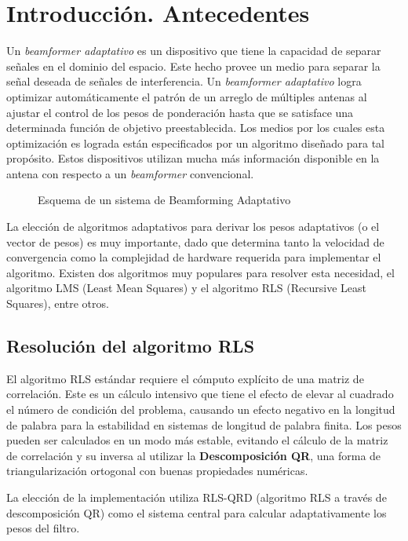 \documentclass[a4paper]{article}
\begin{document}
\section{Introducción. Antecedentes}

Un \textit{beamformer adaptativo} es un dispositivo que tiene la capacidad de separar señales en el dominio del espacio. Este hecho provee un medio para separar la señal deseada de señales de interferencia. Un \textit{beamformer adaptativo} logra optimizar automáticamente el patrón de un arreglo de múltiples antenas al ajustar el control de los pesos de ponderación hasta que se satisface una determinada función de objetivo preestablecida. Los medios por los cuales esta optimización es lograda están especificados por un algoritmo diseñado para tal propósito. Estos dispositivos utilizan mucha más información disponible en la antena con respecto a un \textit{beamformer} convencional.

\begin{figure}[htb!]
        \centering
        \caption{Esquema de un sistema de Beamforming Adaptativo}
        \label{fig:Adaptive_Beamforming}
\end{figure}

La elección de algoritmos adaptativos para derivar los pesos adaptativos (o el vector de pesos) es muy importante, dado que determina tanto la velocidad de convergencia como la complejidad de hardware requerida para implementar el algoritmo. Existen dos algoritmos muy populares para resolver esta necesidad, el algoritmo LMS (Least Mean Squares) y el algoritmo RLS (Recursive Least Squares), entre otros.

\subsection{Resolución del algoritmo RLS}

El algoritmo RLS estándar requiere el cómputo explícito de una matriz de correlación. Este es un cálculo intensivo que tiene el efecto de elevar al cuadrado el número de condición del problema, causando un efecto negativo en la longitud de palabra para la estabilidad en sistemas de longitud de palabra finita. Los pesos pueden ser calculados en un modo más estable, evitando el cálculo de la matriz de correlación y su inversa al utilizar la \textbf{Descomposición QR}, una forma de triangularización ortogonal con buenas propiedades numéricas. 

La elección de la implementación utiliza RLS-QRD (algoritmo RLS a través de descomposición QR) como el sistema central para calcular adaptativamente los pesos del filtro.
\end{document}
